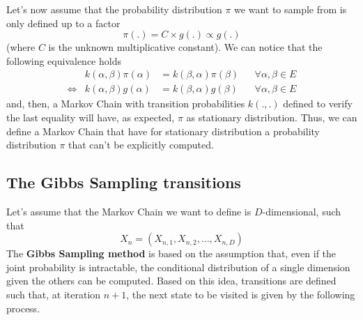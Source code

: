 Let's now assume that the probability distribution $\pi$ we want to sample from is only defined up to a factor
\begin{equation}\pi(.)=C \times g(.) \propto g(.)\end{equation}
(where $C$ is the unknown multiplicative constant). We can notice that the following equivalence holds
\begin{equation}\begin{aligned}
& k(\alpha, \beta) \pi(\alpha) &=k(\beta, \alpha) \pi(\beta) & & \forall \alpha, \beta \in E \\
\Longleftrightarrow & k(\alpha, \beta) g(\alpha) &=k(\beta, \alpha) g(\beta) & & \forall \alpha, \beta \in E
\end{aligned}\end{equation}
and, then, a Markov Chain with transition probabilities $k(.,.)$ defined to verify the last equality will have, as expected, $\pi$ as stationary distribution. Thus, we can define a Markov Chain that have for stationary distribution a probability distribution $\pi$ that can't be explicitly computed.

\subsection{The Gibbs Sampling transitions}

Let's assume that the Markov Chain we want to define is $D$-dimensional, such that
\begin{equation}X_{n}=\left(X_{n, 1}, X_{n, 2}, \dots, X_{n, D}\right)\end{equation}
The \textbf{Gibbs Sampling method} is based on the assumption that, even if the joint probability is intractable, the conditional distribution of a single dimension given the others can be computed. Based on this idea, transitions are defined such that, at iteration $n+1$, the next state to be visited is given by the following process.


